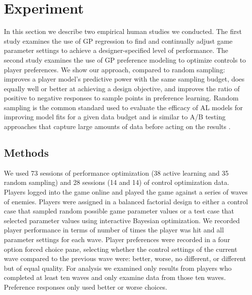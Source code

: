 \documentclass[letterpaper]{article}
\begin{document}
\section{Experiment}
In this section we describe two empirical human studies we conducted. The first study examines the use of GP regression to find and continually adjust game parameter settings to achieve a designer-specified level of performance. The second study examines the use of GP preference modeling to optimize controls to player preferences. We show our approach, compared to random sampling: improves a player model's predictive power with the same sampling budget, does equally well or better at achieving a design objective, and improves the ratio of positive to negative responses to sample points in preference learning. Random sampling is the common standard used to evaluate the efficacy of AL models for improving model fits for a given data budget and is similar to A/B testing approaches that capture large amounts of data before acting on the results \cite{settles2012:al-book}.


\subsection{Methods}
We used 73 sessions of performance optimization (38 active learning and 35 random sampling) and 28 sessions (14 and 14) of control optimization data. Players logged into the game online and played the game against a series of waves of enemies. Players were assigned in a balanced factorial design to either a control case that sampled random possible game parameter values or a test case that selected parameter values using interactive Bayesian optimization.
We recorded player performance in terms of number of times the player was hit and all parameter settings for each wave. Player preferences were recorded in a four option forced choice pane, selecting whether the control settings of the current wave compared to the previous wave were: better, worse, no different, or different but of equal quality.
For analysis we examined only results from players who completed at least ten waves and only examine data from those ten waves. Preference responses only used better or worse choices.
\end{document}
